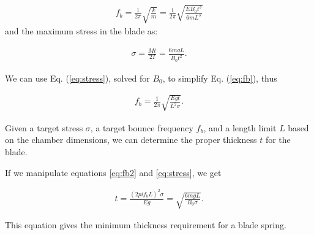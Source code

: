 \begin{eqnarray}
f_b = \frac{1}{2\pi}\sqrt{\frac{k}{m}}=\frac{1}{2\pi}\sqrt{\frac{E B_0 t^3}{6 m L^3}}
\label{eq:fb}
\end{eqnarray}
and the maximum stress in the blade as:

\begin{eqnarray}
\sigma = \frac{Mt}{2I} = \frac{6 m g L}{ B_0 t^2}.
\label{eq:stress}
\end{eqnarray}

We can use Eq. (\ref{eq:stress}), solved for $B_0$, to simplify Eq. (\ref{eq:fb}), thus

\begin{eqnarray}
f_b = \frac{1}{2\pi}\sqrt{\frac{E g t}{L^2 \sigma}}.
\label{eq:fb2}
\end{eqnarray}

Given a target stress $\sigma$, a target bounce frequency $f_b$, and a length limit $L$ based on the chamber dimensions, we can determine the proper thickness $t$ for the blade.

If we manipulate equations \ref{eq:fb2} and \ref{eq:stress}, we get

\begin{eqnarray}
t = \frac{(2 pi f_b L)^2 \sigma}{E g} = \sqrt{\frac{6 m g L}{ B_0 \sigma}}.
\label{eq:thickness}
\end{eqnarray}

This equation gives the minimum thickness requirement for a blade spring.

% 
% 



